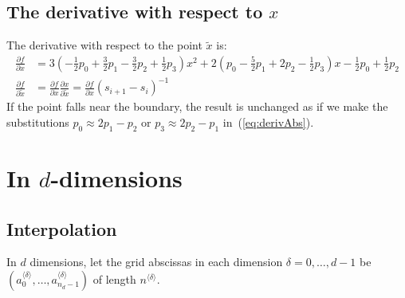 \documentclass[11pt]{article}
\begin{document}

\subsection{The derivative with respect to $x$}


The derivative with respect to the point $\tilde{x}$ is:
\begin{equation}
\begin{split}
\frac{\partial f}{\partial x} &=
3 \left ( - \frac{1}{2} p_0 + \frac{3}{2} p_1 - \frac{3}{2} p_2 + \frac{1}{2} p_3 \right ) x^2 + 2 \left ( p_0 - \frac{5}{2} p_1 + 2 p_2 - \frac{1}{2} p_3 \right ) x  - \frac{1}{2} p_0 + \frac{1}{2} p_2 \\
\frac{\partial f}{\partial \tilde{x}} 
&= \frac{\partial f}{\partial x} \frac{\partial x}{\partial \tilde{x}} = \frac{\partial f}{\partial x} \left ( s_{i+1} - s_i \right )^{-1}
\end{split}
\label{eq:derivAbs}
\end{equation}
If the point falls near the boundary, the result is unchanged as if we make the substitutions $p_0 \approx 2 p_1 - p_2$ or $p_3 \approx 2 p_2 - p_1$ in~(\ref{eq:derivAbs}).



\section{In $d$-dimensions}



\subsection{Interpolation}


In $d$ dimensions, let the grid abscissas in each dimension $\delta = 0, \dots, d-1$ be $(a_0^{\langle \delta \rangle}, \dots, a_{n_d-1}^{\langle \delta \rangle})$ of length $n^{\langle \delta \rangle}$.
\end{document}
